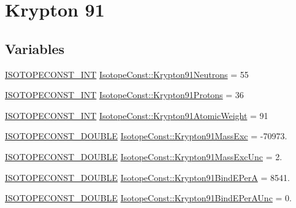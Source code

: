 \hypertarget{group___isotope_const-_krypton-_kr91}{}\section{Krypton 91}
\label{group___isotope_const-_krypton-_kr91}
\subsection*{Variables}
\begin{DoxyCompactItemize}
\item 
\mbox{\hyperlink{group___isotope_const-_macros_ga5f18360b3e99483a35c32d789e62621c}{I\+S\+O\+T\+O\+P\+E\+C\+O\+N\+S\+T\+\_\+\+I\+NT}} \mbox{\hyperlink{group___isotope_const-_krypton-_kr91_gacdc6f3ce40f3280004d83dea43863faa}{Isotope\+Const\+::\+Krypton91\+Neutrons}} = 55
\item 
\mbox{\hyperlink{group___isotope_const-_macros_ga5f18360b3e99483a35c32d789e62621c}{I\+S\+O\+T\+O\+P\+E\+C\+O\+N\+S\+T\+\_\+\+I\+NT}} \mbox{\hyperlink{group___isotope_const-_krypton-_kr91_ga05c7299c79f1ec88967b1696d465eb64}{Isotope\+Const\+::\+Krypton91\+Protons}} = 36
\item 
\mbox{\hyperlink{group___isotope_const-_macros_ga5f18360b3e99483a35c32d789e62621c}{I\+S\+O\+T\+O\+P\+E\+C\+O\+N\+S\+T\+\_\+\+I\+NT}} \mbox{\hyperlink{group___isotope_const-_krypton-_kr91_gab2102df86c79316ef941f57fe92dbc5f}{Isotope\+Const\+::\+Krypton91\+Atomic\+Weight}} = 91
\item 
\mbox{\hyperlink{group___isotope_const-_macros_ga8f45a7272ce02c0b4c65c44636ed719a}{I\+S\+O\+T\+O\+P\+E\+C\+O\+N\+S\+T\+\_\+\+D\+O\+U\+B\+LE}} \mbox{\hyperlink{group___isotope_const-_krypton-_kr91_ga3374efa6b83ceeda756e5f5d825f04a9}{Isotope\+Const\+::\+Krypton91\+Mass\+Exc}} = -\/70973.
\item 
\mbox{\hyperlink{group___isotope_const-_macros_ga8f45a7272ce02c0b4c65c44636ed719a}{I\+S\+O\+T\+O\+P\+E\+C\+O\+N\+S\+T\+\_\+\+D\+O\+U\+B\+LE}} \mbox{\hyperlink{group___isotope_const-_krypton-_kr91_ga84c2da4f8574f244154ce41755933bf1}{Isotope\+Const\+::\+Krypton91\+Mass\+Exc\+Unc}} = 2.
\item 
\mbox{\hyperlink{group___isotope_const-_macros_ga8f45a7272ce02c0b4c65c44636ed719a}{I\+S\+O\+T\+O\+P\+E\+C\+O\+N\+S\+T\+\_\+\+D\+O\+U\+B\+LE}} \mbox{\hyperlink{group___isotope_const-_krypton-_kr91_gac75509da8abe3c9b1418b62552a45e8f}{Isotope\+Const\+::\+Krypton91\+Bind\+E\+PerA}} = 8541.
\item 
\mbox{\hyperlink{group___isotope_const-_macros_ga8f45a7272ce02c0b4c65c44636ed719a}{I\+S\+O\+T\+O\+P\+E\+C\+O\+N\+S\+T\+\_\+\+D\+O\+U\+B\+LE}} \mbox{\hyperlink{group___isotope_const-_krypton-_kr91_ga61556a2b5a140ed8f20f08e3ffa8a089}{Isotope\+Const\+::\+Krypton91\+Bind\+E\+Per\+A\+Unc}} = 0.

\end{DoxyCompactItemize}
